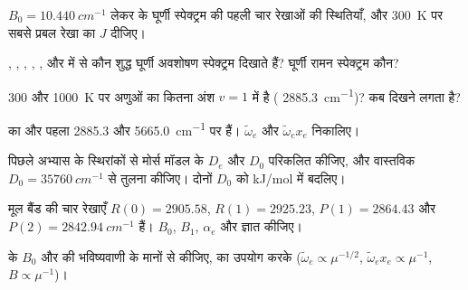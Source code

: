 \begin{exercise}[$\star$]\label{exo:b3:rovibrational-spectroscopy:2}
$B_0 = \qty{10.440}{cm^{-1}}$ लेकर  के घूर्णी स्पेक्ट्रम की पहली चार
रेखाओं की स्थितियाँ, और \qty{300}{K} पर सबसे प्रबल रेखा का $J$ दीजिए।
\end{exercise}

\begin{exercise}[$\star$]\label{exo:b3:rovibrational-spectroscopy:3}
, , , , ,  और  में से कौन शुद्ध
घूर्णी अवशोषण स्पेक्ट्रम दिखाते हैं? घूर्णी रामन स्पेक्ट्रम कौन?
\end{exercise}

\begin{exercise}[$\star$]\label{exo:b3:rovibrational-spectroscopy:4}
300 और \qty{1000}{K} पर  अणुओं का कितना अंश $v = 1$ में है
( \qty{2885.3}{cm^{-1}})?  कब दिखने लगता है?
\end{exercise}

\begin{exercise}[$\star\star$]\label{exo:b3:rovibrational-spectroscopy:5}
 का  और पहला  2885.3 और
\qty{5665.0}{cm^{-1}} पर हैं। $\tilde\omega_e$ और $\tilde\omega_ex_e$ निकालिए।
\end{exercise}

\begin{exercise}[$\star\star$]\label{exo:b3:rovibrational-spectroscopy:6}
पिछले अभ्यास के स्थिरांकों से मोर्स मॉडल के $D_e$ और $D_0$ परिकलित कीजिए,
और वास्तविक $D_0 = \qty{35760}{cm^{-1}}$ से तुलना कीजिए। दोनों
$D_0$ को \unit{kJ/mol} में बदलिए।
\end{exercise}

\begin{exercise}[$\star\star$]\label{exo:b3:rovibrational-spectroscopy:7}
 मूल बैंड की चार रेखाएँ $R(0) = 2905.58$, $R(1) = 2925.23$,
$P(1) = 2864.43$ और $P(2) = \qty{2842.94}{cm^{-1}}$ हैं। $B_0$, $B_1$, $\alpha_e$ और
 ज्ञात कीजिए।
\end{exercise}

\begin{exercise}[$\star\star$]\label{exo:b3:rovibrational-spectroscopy:8}
 के $B_0$ और  की भविष्यवाणी  के मानों से कीजिए,
 का उपयोग करके ($\tilde\omega_e \propto \mu^{-1/2}$, $\tilde\omega_ex_e \propto
\mu^{-1}$, $B \propto \mu^{-1}$)।
\end{exercise}

